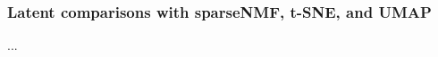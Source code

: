 \subsubsection{Latent comparisons with sparseNMF, t-SNE, and UMAP}
\label{subsubsection:latent_comparisons_traditional}
...
